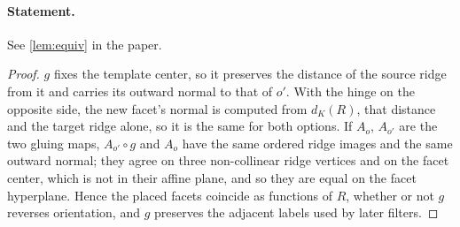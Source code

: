 \documentclass[11pt]{article}
\theoremstyle{definition}
\theoremstyle{remark}
\begin{document}
\paragraph{Statement.} See \ref{lem:equiv} in the paper.

\begin{proof}
$g$ fixes the template center, so it preserves the distance of the source
ridge from it and carries its outward normal to that of $o'$. With the
hinge on the opposite side, the new facet's normal is computed from
$d_K(R)$, that distance and the target ridge alone, so it is the same for
both options. If $A_o$, $A_{o'}$ are the two gluing maps, $A_{o'}\circ g$
and $A_o$ have the same ordered ridge images and the same outward normal;
they agree on three non-collinear ridge vertices and on the facet center,
which is not in their affine plane, and so they are equal on the facet
hyperplane. Hence the placed facets coincide as functions of $R$, whether
or not $g$ reverses orientation, and $g$ preserves the adjacent labels
used by later filters.
\end{proof}
\end{document}
